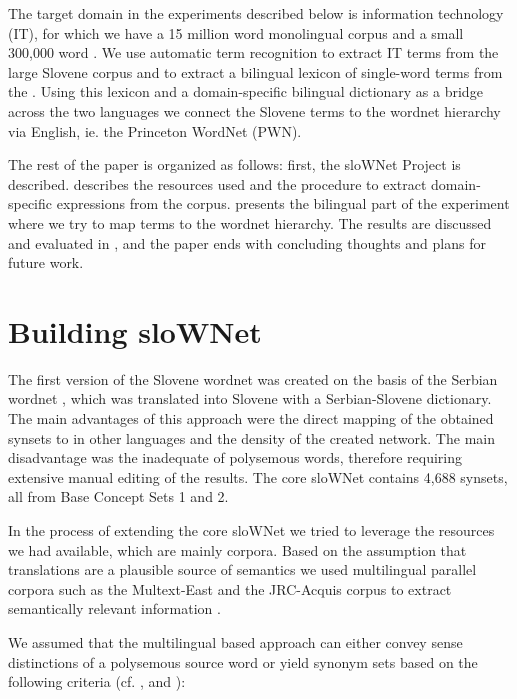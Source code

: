 \documentclass[output=paper]{LSP/langsci}
\begin{document}
The target domain in the experiments described below is information technology (IT), for which we have a 15 million word monolingual corpus and a small 300,000 word . We use automatic term recognition to extract  IT terms from the large Slovene corpus and  to extract a bilingual lexicon of single-word terms from the . Using this lexicon and a domain-specific bilingual dictionary as a bridge across the two languages we connect the Slovene  terms to the wordnet hierarchy via English, ie. the Princeton WordNet (PWN).

The rest of the paper is organized as follows: first, the sloWNet Project is described.  describes the resources used and the procedure to extract domain-specific expressions from the corpus.  presents the bilingual part of the experiment where we try to map terms to the wordnet hierarchy. The results are discussed and evaluated in , and the paper ends with concluding thoughts and plans for future work.

\section{Building sloWNet}\label{sec:vintar:2}

The first version of the Slovene wordnet was created on the basis of the Serbian wordnet \citep{KrstevEtAl2004}, which was translated into Slovene with a Serbian-Slovene dictionary. The main advantages of this approach were the direct mapping of the obtained synsets to  in other languages and the density of the created network. The main disadvantage was the inadequate  of polysemous words, therefore requiring extensive manual editing of the results. The core sloWNet contains 4,688 synsets, all from Base Concept Sets 1 and 2. 

In the process of extending the core sloWNet we tried to leverage the resources we had available, which are mainly corpora. Based on the assumption that translations are a plausible source of semantics we used multilingual parallel corpora such as the Multext-East \citep{Erjavec1998} and the JRC-Acquis corpus \citep{SteinbergerEtAl2006} to extract semantically relevant information \citep{Fišer2007}.

We assumed that the multilingual  based approach can either convey sense distinctions of a polysemous source word or yield synonym sets based on the following criteria (cf. \citealt{Dyvik1998}, \citealt{Diab2002} and \citealt{IdeEtAl2002}):
\end{document}

